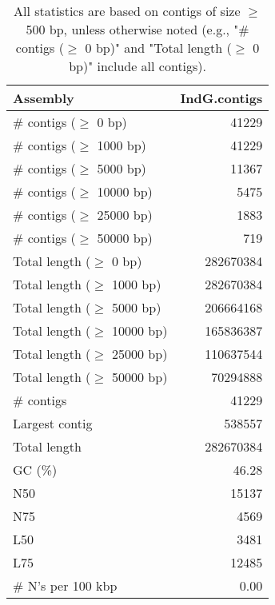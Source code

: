 \documentclass[12pt,a4paper]{article}
\begin{document}
\begin{table}[ht]
\begin{center}
\caption{All statistics are based on contigs of size $\geq$ 500 bp, unless otherwise noted (e.g., "\# contigs ($\geq$ 0 bp)" and "Total length ($\geq$ 0 bp)" include all contigs).}
\begin{tabular}{|l*{1}{|r}|}
\hline
Assembly & IndG.contigs \\ \hline
\# contigs ($\geq$ 0 bp) & 41229 \\ \hline
\# contigs ($\geq$ 1000 bp) & 41229 \\ \hline
\# contigs ($\geq$ 5000 bp) & 11367 \\ \hline
\# contigs ($\geq$ 10000 bp) & 5475 \\ \hline
\# contigs ($\geq$ 25000 bp) & 1883 \\ \hline
\# contigs ($\geq$ 50000 bp) & 719 \\ \hline
Total length ($\geq$ 0 bp) & 282670384 \\ \hline
Total length ($\geq$ 1000 bp) & 282670384 \\ \hline
Total length ($\geq$ 5000 bp) & 206664168 \\ \hline
Total length ($\geq$ 10000 bp) & 165836387 \\ \hline
Total length ($\geq$ 25000 bp) & 110637544 \\ \hline
Total length ($\geq$ 50000 bp) & 70294888 \\ \hline
\# contigs & 41229 \\ \hline
Largest contig & 538557 \\ \hline
Total length & 282670384 \\ \hline
GC (\%) & 46.28 \\ \hline
N50 & 15137 \\ \hline
N75 & 4569 \\ \hline
L50 & 3481 \\ \hline
L75 & 12485 \\ \hline
\# N's per 100 kbp & 0.00 \\ \hline
\end{tabular}
\end{center}
\end{table}
\end{document}
